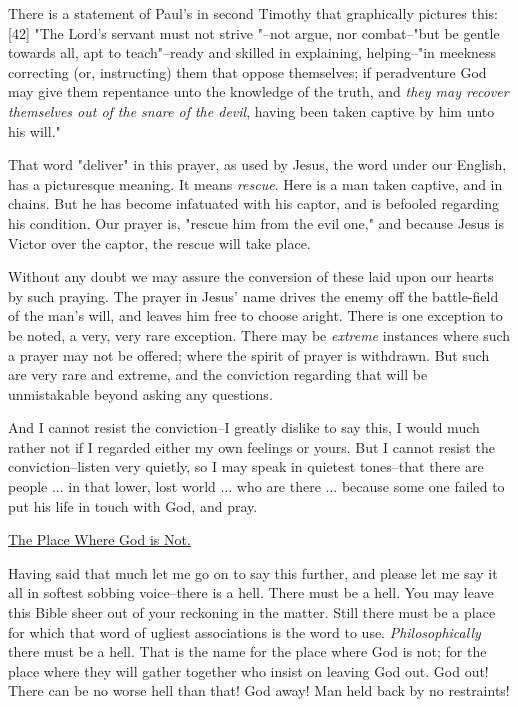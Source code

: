 There is a statement of Paul's in second Timothy that graphically pictures
this:[42] "The Lord's servant must not strive "--not argue, nor
combat--"but be gentle towards all, apt to teach"--ready and skilled in
explaining, helping--"in meekness correcting (or, instructing) them that
oppose themselves; if peradventure God may give them repentance unto the
knowledge of the truth, and \textit{they may recover themselves out of the snare
of the devil}, having been taken captive by him unto his will."

That word "deliver" in this prayer, as used by Jesus, the word under our
English, has a picturesque meaning. It means \textit{rescue}. Here is a man taken
captive, and in chains. But he has become infatuated with his captor, and
is befooled regarding his condition. Our prayer is, "rescue him from the
evil one," and because Jesus is Victor over the captor, the rescue will
take place.

Without any doubt we may assure the conversion of these laid upon our
hearts by such praying. The prayer in Jesus' name drives the enemy off the
battle-field of the man's will, and leaves him free to choose aright.
There is one exception to be noted, a very, very rare exception. There may
be \textit{extreme} instances where such a prayer may not be offered; where the
spirit of prayer is withdrawn. But such are very rare and extreme, and the
conviction regarding that will be unmistakable beyond asking any
questions.

And I cannot resist the conviction--I greatly dislike to say this, I would
much rather not if I regarded either my own feelings or yours. But I
cannot resist the conviction--listen very quietly, so I may speak in
quietest tones--that there are people ... in that lower, lost world ...
who are there ... because some one failed to put his life in touch with
God, and pray.



\underline{The Place Where God is Not.}


Having said that much let me go on to say this further, and please let me
say it all in softest sobbing voice--there is a hell. There must be a
hell. You may leave this Bible sheer out of your reckoning in the matter.
Still there must be a place for which that word of ugliest associations is
the word to use. \textit{Philosophically} there must be a hell. That is the name
for the place where God is not; for the place where they will gather
together who insist on leaving God out. God out! There can be no worse
hell than that! God away! Man held back by no restraints!

